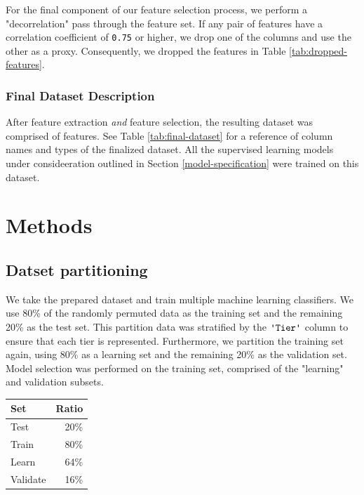 \documentclass{article}
\newcommand{\Qty}[1]{\oldstylenums{#1}}
\newcommand{\Column}[1]{\ensuremath{\texttt{\textquotesingle{}#1\textquotesingle{}}}\xspace}
\begin{document}
For the final component of our feature selection process, we perform a "decorrelation" pass through the feature set.
If any pair of features have a correlation coefficient of \texttt{0.75} or higher, we drop one of the columns and use the other as a proxy.
Consequently, we dropped the features in Table \ref{tab:dropped-features}.


\hypertarget{final-datset-decription}{
\subsubsection{Final Dataset Description}\label{final-datset-decription}}

After feature extraction \emph{and} feature selection, the resulting dataset was comprised of \Qty{96} features.
See Table \ref{tab:final-dataset} for a reference of column names and types of the finalized dataset.
All the supervised learning models under consideeration outlined in Section \ref{model-specification} were trained on this dataset.


\section{Methods}


\hypertarget{datset-partitioning}{%
\subsection{Datset partitioning}\label{datset-partitioning}}

We take the prepared dataset and train multiple machine learning classifiers.
We use 80\% of the randomly permuted data as the training set and the remaining 20\% as the test set.
This partition data was stratified by the \Column{Tier} column to ensure that each tier is represented.
Furthermore, we partition the training set again, using 80\% as a learning set and the remaining 20\% as the validation set.
Model selection was performed on the training set, comprised of the "learning" and validation subsets.

\begin{table}[!htbp] \centering 
\caption{Distribution for partitioning dataset,	stratified by \Column{Tier}.}
\label{tab:shrunk-observations}
\begin{longtable}[]{@{}lr@{}}
\toprule
Set & Ratio \\
\midrule
\endhead
Test & 20\% \\
Train & 80\% \\
Learn & 64\% \\
Validate & 16\% \\
\bottomrule
\end{longtable}
\end{table}
\end{document}

